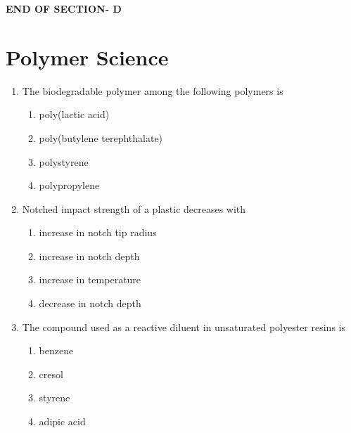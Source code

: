 \documentclass[journal,12pt,onecolumn]{IEEEtran}
\begin{document}
\vspace{3\baselineskip}
\begin{center}
    \item[\textbf{END OF SECTION- D}]
\end{center}

\newpage
\section*{Polymer Science}
\vspace{1cm}
\begin{enumerate}[label=\arabic*)]

\item The biodegradable polymer among the following polymers is
\hfill{} \\

\vspace{0.2cm}
\begin{enumerate}[label=\alph*)]
\item poly(lactic acid)
\item poly(butylene terephthalate)
\item polystyrene
\item polypropylene
\end{enumerate}

\vspace{0.5cm}

\item Notched impact strength of a plastic decreases with
\hfill{} \\

\vspace{0.2cm}
\begin{enumerate}[label=\alph*)]
\item increase in notch tip radius
\item increase in notch depth
\item increase in temperature
\item decrease in notch depth
\end{enumerate}

\vspace{0.5cm}

\item The compound used as a reactive diluent in unsaturated polyester resins is
\hfill{} \\

\vspace{0.2cm}
\begin{enumerate}[label=\alph*)]
\item benzene
\item cresol
\item styrene
\item adipic acid
\end{enumerate}


\end{enumerate}
\end{document}
